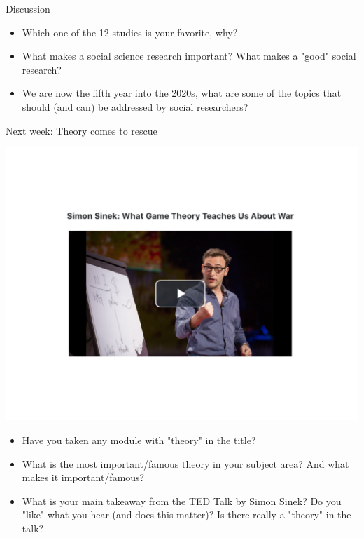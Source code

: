\documentclass[
  10pt,
  ignorenonframetext,
]{beamer}
\begin{document}
\begin{frame}{Discussion}
\protect\hypertarget{discussion}{}
\begin{itemize}
  \item Which one of the 12 studies is your favorite, why?
  \vspace{0.3cm}
  \item What makes a social science research important? What makes a "good" social research?
  \vspace{0.3cm}
  \item We are now the fifth year into the 2020s, what are some of the topics that should (and can) be addressed by social researchers?
\end{itemize}
\end{frame}

\begin{frame}{Next week: Theory comes to rescue}
\protect\hypertarget{next-week-theory-comes-to-rescue}{}
\begin{center}\includegraphics[width=0.7\linewidth]{Figs/simon} \end{center}
\begin{itemize}
\small
  \item Have you taken any module with "theory" in the title?
  \item What is the most important/famous theory in your subject area? And what makes it important/famous?
  \item What is your main takeaway from the TED Talk by Simon Sinek? Do you "like" what you hear (and does this matter)? Is there really a "theory" in the talk?
\end{itemize}
\end{frame}
\end{document}
